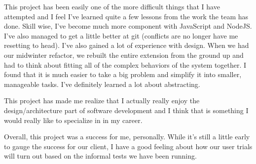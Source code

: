 This project has been easily one of the more difficult things that I have attempted and I feel I've learned quite a few lessons from the work the team has done. Skill wise, I’ve become much more component with JavaScript and NodeJS. I’ve also managed to get a little better at git (conflicts are no longer have me resetting to head). I’ve also gained a lot of experience with design. When we had our midwinter refactor, we rebuilt the entire extension from the ground up and had to think about fitting all of the complex behaviors of the system together. I found that it is much easier to take a big problem and simplify it into smaller, manageable tasks. I’ve definitely learned a lot about abstracting.

This project has made me realize that I actually really enjoy the design/architecture part of software development and I think that is something I would really like to specialize in in my career. 

Overall, this project was a success for me, personally. While it’s still a little early to gauge the success for our client, I have a good feeling about how our user trials will turn out based on the informal tests we have been running.


